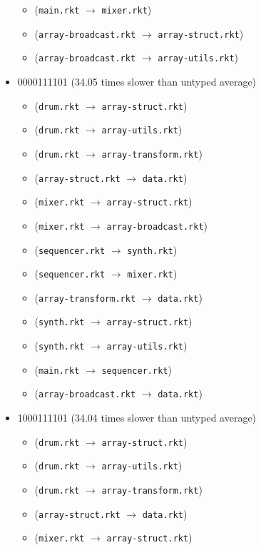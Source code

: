 \documentclass{article}
\newcommand{\mono}[1]{\texttt{#1}}
\begin{document}
\begin{itemize}
\begin{itemize}
  \item (\mono{main.rkt} $\rightarrow$ \mono{mixer.rkt})
  \item (\mono{array-broadcast.rkt} $\rightarrow$ \mono{array-struct.rkt})
  \item (\mono{array-broadcast.rkt} $\rightarrow$ \mono{array-utils.rkt})
  \end{itemize}
\item 0000111101 (34.05 times slower than untyped average)
  \begin{itemize}
  \item (\mono{drum.rkt} $\rightarrow$ \mono{array-struct.rkt})
  \item (\mono{drum.rkt} $\rightarrow$ \mono{array-utils.rkt})
  \item (\mono{drum.rkt} $\rightarrow$ \mono{array-transform.rkt})
  \item (\mono{array-struct.rkt} $\rightarrow$ \mono{data.rkt})
  \item (\mono{mixer.rkt} $\rightarrow$ \mono{array-struct.rkt})
  \item (\mono{mixer.rkt} $\rightarrow$ \mono{array-broadcast.rkt})
  \item (\mono{sequencer.rkt} $\rightarrow$ \mono{synth.rkt})
  \item (\mono{sequencer.rkt} $\rightarrow$ \mono{mixer.rkt})
  \item (\mono{array-transform.rkt} $\rightarrow$ \mono{data.rkt})
  \item (\mono{synth.rkt} $\rightarrow$ \mono{array-struct.rkt})
  \item (\mono{synth.rkt} $\rightarrow$ \mono{array-utils.rkt})
  \item (\mono{main.rkt} $\rightarrow$ \mono{sequencer.rkt})
  \item (\mono{array-broadcast.rkt} $\rightarrow$ \mono{data.rkt})
  \end{itemize}
\item 1000111101 (34.04 times slower than untyped average)
  \begin{itemize}
  \item (\mono{drum.rkt} $\rightarrow$ \mono{array-struct.rkt})
  \item (\mono{drum.rkt} $\rightarrow$ \mono{array-utils.rkt})
  \item (\mono{drum.rkt} $\rightarrow$ \mono{array-transform.rkt})
  \item (\mono{array-struct.rkt} $\rightarrow$ \mono{data.rkt})
  \item (\mono{mixer.rkt} $\rightarrow$ \mono{array-struct.rkt})

\end{itemize}
\end{itemize}
\end{document}
